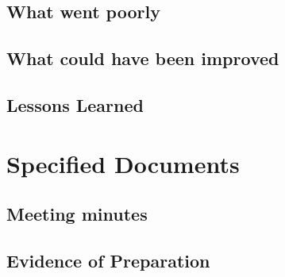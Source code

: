 \documentclass[a4paper]{report}
\begin{document}
\section{What went poorly}
\section{What could have been improved}
\section{Lessons Learned}

\chapter*{Specified Documents}
\section{Meeting minutes}
\section{Evidence of Preparation}
\end{document}
